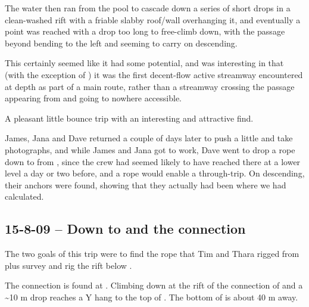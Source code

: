 The water then ran from the pool to cascade down a series of short drops
in a clean-washed rift with a friable slabby roof/wall overhanging it,
and eventually a point was reached with a drop too long to free-climb
down, with the passage beyond bending to the left and seeming to carry
on descending.

This certainly seemed like it had some potential, and was interesting in
that (with the exception of ) it was the first
decent-flow active streamway encountered at depth as part of a main
route, rather than a streamway crossing the passage appearing from and
going to nowhere accessible.

A pleasant little bounce trip with an interesting and attractive find.



James, Jana and Dave returned a couple of days later to push a little
and take photographs, and while James and Jana got to work, Dave went to
drop a rope down to  from ,
since the  crew had seemed likely to have reached there at a
lower level a day or two before, and a rope would enable a through-trip. On descending, their anchors were found, showing that they actually had
been where we had calculated.



\subsection{15-8-09 -- Down to  and the connection}


The two goals of this trip were to find the rope that Tim and Thara
rigged from  plus survey and rig the rift below
.

The connection is found at . Climbing
down at the rift of the connection of  and
 a \textasciitilde 10 m drop reaches a Y hang
to the top of . The bottom of  is
about 40 m away.

